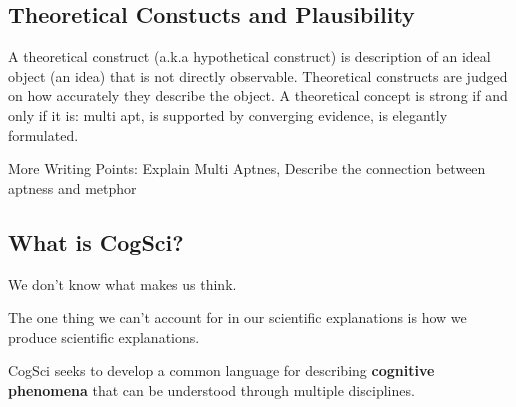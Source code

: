 \documentclass[twoside]{article}
\begin{document}
\subsection{Theoretical Constucts and Plausibility}

A theoretical construct (a.k.a hypothetical construct) is description of
an ideal object (an idea) that is not directly observable. Theoretical constructs
are judged on how accurately they describe the object. A theoretical concept is
strong if and only if it is: multi apt, is supported by converging evidence, is
elegantly formulated.

More Writing Points: Explain Multi Aptnes, Describe the connection between aptness
and metphor

\subsection{What is CogSci?}
We don't know what makes us think.

The one thing we can't account for in our scientific explanations is
how we produce scientific explanations.

CogSci seeks to develop a common language for describing \textbf{cognitive phenomena}
that can be understood through multiple disciplines.
\end{document}
